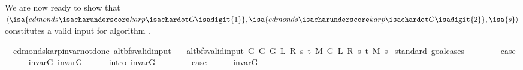 \begin{isabellebody}
\endisatagproof
{\isafoldproof}%
%
\isadelimproof
%
\endisadelimproof
%
\begin{isamarkuptext}%
We are now ready to show that $\langle \isa{edmonds{\isacharunderscore}{\kern0pt}karp{\isachardot}{\kern0pt}G{\isadigit{1}}},\isa{edmonds{\isacharunderscore}{\kern0pt}karp{\isachardot}{\kern0pt}G{\isadigit{2}}},\isa{s}\rangle$
constitutes a valid input for algorithm .%
\end{isamarkuptext}\isamarkuptrue%
\isamarkupfalse%
\ {\isacharparenleft}{\kern0pt}\ edmonds{\isacharunderscore}{\kern0pt}karp{\isacharunderscore}{\kern0pt}invar{\isacharunderscore}{\kern0pt}not{\isacharunderscore}{\kern0pt}done{\isacharunderscore}{\kern0pt}{}{\isacharparenright}{\kern0pt}\ alt{\isacharunderscore}{\kern0pt}bfs{\isacharunderscore}{\kern0pt}valid{\isacharunderscore}{\kern0pt}input{\isacharcolon}{\kern0pt}\isanewline
\ \ \ {\isachardoublequoteopen}alt{\isacharunderscore}{\kern0pt}bfs{\isacharunderscore}{\kern0pt}valid{\isacharunderscore}{\kern0pt}input{\isacharprime}{\kern0pt}\ {\isacharparenleft}{\kern0pt}G{}\ G\ {\isacharparenleft}{\kern0pt}G{}\ L\ R\ s\ t\ M{\isacharparenright}{\kern0pt}{\isacharparenright}{\kern0pt}\ {\isacharparenleft}{\kern0pt}G{}\ L\ R\ s\ t\ M{\isacharparenright}{\kern0pt}\ s{\isachardoublequoteclose}\isanewline
%
\isadelimproof
%
\endisadelimproof
%
\isatagproof
{}\isamarkupfalse%
\ {\isacharparenleft}{\kern0pt}standard{\isacharcomma}{\kern0pt}\ goal{\isacharunderscore}{\kern0pt}cases{\isacharparenright}{\kern0pt}\isanewline
\ \ \isamarkupfalse%
\ {}\isanewline
\ \ \isamarkupfalse%
\ {\isacharquery}{\kern0pt}case\isanewline
\ \ \ \ \isamarkupfalse%
\ invar{\isacharunderscore}{\kern0pt}G\ invar{\isacharunderscore}{\kern0pt}G{}\isanewline
\ \ \ \ \isamarkupfalse%
\ {\isacharparenleft}{\kern0pt}intro\ invar{\isacharunderscore}{\kern0pt}G{}{\isacharparenright}{\kern0pt}\isanewline
{}\isamarkupfalse%
\isanewline
\ \ \isamarkupfalse%
\ {}\isanewline
\ \ \isamarkupfalse%
\ {\isacharquery}{\kern0pt}case\isanewline
\ \ \ \ \isamarkupfalse%
\ invar{\isacharunderscore}{\kern0pt}G{}\isanewline
\ \ \ \ \isacommand{{\isachardot}{\kern0pt}}\isamarkupfalse%
\isanewline
{}\isamarkupfalse%

\end{isabellebody}
